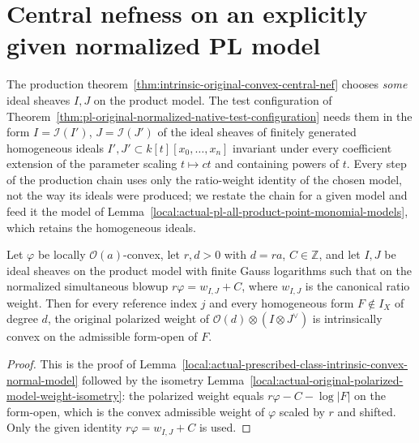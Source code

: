 \section{Central nefness on an explicitly given normalized PL model}

The production theorem~\ref{thm:intrinsic-original-convex-central-nef}
chooses \emph{some} ideal sheaves $I,J$ on the product model.  The test
configuration of
Theorem~\ref{thm:pl-original-normalized-native-test-configuration} needs
them in the form $I=\mathcal I(I')$, $J=\mathcal I(J')$ of the ideal sheaves
of finitely generated homogeneous ideals $I',J'\subset k[t][x_0,\dots,x_n]$
invariant under every coefficient extension of the parameter scaling
$t\mapsto ct$ and containing powers of $t$.  Every step of the production
chain uses only the ratio-weight identity of the chosen model, not the way
its ideals were produced; we restate the chain for a given model and feed it
the model of Lemma~\ref{local:actual-pl-all-product-point-monomial-models},
which retains the homogeneous ideals.

\begin{lemma}
\label{lem:central-nef-tc-given-model-convexity}
\leanok
{}
Let $\varphi$ be locally $\mathcal O(a)$-convex, let $r,d>0$ with $d=ra$,
$C\in\mathbb Z$, and let $I,J$ be ideal sheaves on the product model with
finite Gauss logarithms such that on the normalized simultaneous blowup
$r\varphi=w_{I,J}+C$, where $w_{I,J}$ is the canonical ratio weight.  Then for
every reference index $j$ and every homogeneous form $F\notin I_X$ of degree
$d$, the original polarized weight of $\mathcal O(d)\otimes(I\otimes
J^\vee)$ is intrinsically convex on the admissible form-open of $F$.
\end{lemma}
\begin{proof}
This is the proof of
Lemma~\ref{local:actual-prescribed-class-intrinsic-convex-normal-model}
followed by the isometry
Lemma~\ref{local:actual-original-polarized-model-weight-isometry}: the
polarized weight equals $r\varphi-C-\log|F|$ on the form-open, which is the
convex admissible weight of $\varphi$ scaled by $r$ and shifted.  Only the
given identity $r\varphi=w_{I,J}+C$ is used.
\end{proof}

